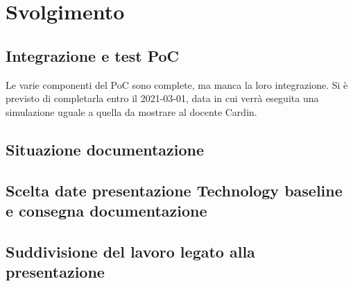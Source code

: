 \section*{Svolgimento}
\subsection*{Integrazione e test PoC}
Le varie componenti del PoC sono complete, ma manca la loro integrazione. Si è previsto di completarla entro il 2021-03-01, data in cui verrà eseguita una simulazione uguale a quella da mostrare al docente Cardin.
\subsection*{Situazione documentazione}

\subsection*{Scelta date presentazione Technology baseline e consegna documentazione}

\subsection*{Suddivisione del lavoro legato alla presentazione}
